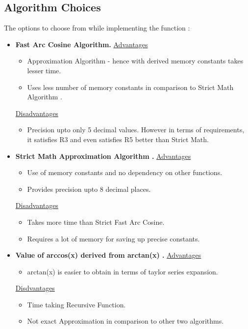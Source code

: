 \documentclass[a4paper,12pt]{article}
\begin{document}
\subsection{Algorithm Choices}
    The options to choose from while implementing the function :
    \begin{itemize}
    \item{\textbf{Fast Arc Cosine Algorithm\cite{Abramowitz Book}.} \newline \underline{Advantages}}
    \begin{itemize} 
        \item {Approximation Algorithm - hence with derived memory constants takes lesser time.}
        \item{Uses less number of memory constants in comparison to Strict Math Algorithm .}
    \end{itemize}
    \underline{Disadvantages}
    \begin{itemize}
        \item {Precision upto only 5 decimal values. However in terms of requirements, it satisfies R3 and even satisfies R5 better than Strict Math.}
    \end{itemize}
    \item{\textbf{Strict Math Approximation Algorithm \cite{Strict Math}.}}
    \newline
    \underline{Advantages}
    \begin{itemize}
        \item {Use of memory constants and no dependency on other functions.}
        \item{Provides precision upto 8 decimal places.}
    \end{itemize}
    \underline{Disadvantages}
    \begin{itemize}
        \item {Takes more time than Strict Fast Arc Cosine.}
        \item{Requires a lot of memory for saving up precise constants.}
    \end{itemize}
    \item{\textbf{Value of arccos(x) derived from arctan(x) \cite{Taylor Series Expansion}.}}
    \newline
    \underline{Advantages}
    \begin{itemize}
        \item {arctan(x) is easier to obtain in terms of taylor series expansion.}
    \end{itemize}
    \underline{Disdvantages}
    \begin{itemize}
        \item {Time taking Recursive Function.}
        \item{Not exact Approximation in comparison to other two algorithms.}
    \end{itemize}
    \end{itemize}
    
\end{document}
